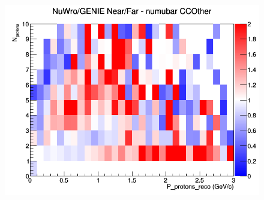 \begin{figure}[h]
\endminipage
{}
\includegraphics[width=\linewidth]{eff_N_P/GAr/protons/ratios/CCOther_NuWro_GENIE_numubar_NF_N_P.png}
\endminipage
\newline
\end{figure}
\clearpage


